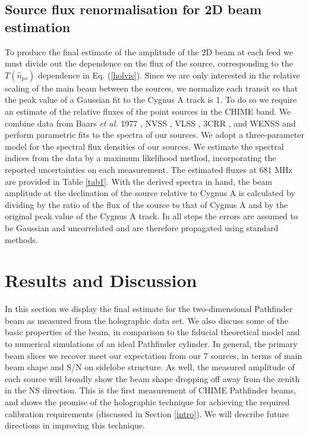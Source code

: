 \subsection{Source flux renormalisation for 2D beam estimation}

To produce the final estimate of the amplitude of the 2D beam at each feed we must divide out the dependence on the flux of the source, corresponding to the $T(\hat{n}_{ps})$ dependence in Eq. (\ref{holvis}). Since we are only interested in the relative scaling of the main beam between the sources, we normalize each transit so that the peak value of a Gaussian fit to the Cygnus A track is 1. To do so we require an estimate of the relative fluxes of the point sources in the CHIME band. We combine data from Baars {\it et al.} 1977 \citep{baars}, NVSS \citep{NVSS}, VLSS \citep{VLSS}, 3CRR \citep{3CRR}, and WENSS \citep{WENSS} and perform parametric fits to the spectra of our sources. We adopt a three-parameter model for the spectral flux densities of our sources. We estimate the spectral indices from the data by a maximum likelihood method, incorporating the reported uncertainties on each measurement. The estimated fluxes at $681$ MHz are provided in Table \ref{tab1}. With the derived spectra in hand, the beam amplitude at the declination of the source relative to Cygnus A is calculated by dividing by the ratio of the flux of the source to that of Cygnus A and by the original peak value of the Cygnus A track. In all steps the errors are assumed to be Gaussian and uncorrelated and are therefore propagated using standard methods.

\section{Results and Discussion} \label{sec3}

In this section we display the final estimate for the two-dimensional Pathfinder beam as measured from the holographic data set. We also discuss some of the basic properties of the beam, in comparison to the fiducial theoretical model and to numerical simulations of an ideal Pathfinder cylinder. In general, the primary beam slices we recover meet our expectation from our 7 sources, in terms of main beam shape and S/N on sidelobe structure. As well, the measured amplitude of each source will broadly show the beam shape dropping off away from the zenith in the NS direction. This is the first measurement of CHIME Pathfinder beams, and shows the promise of the holographic technique for achieving the required calibration requirements (discussed in Section \ref{intro}). We will describe future directions in improving this technique.

